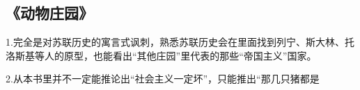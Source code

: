 \subsection{《动物庄园》}
1.完全是对苏联历史的寓言式讽刺，熟悉苏联历史会在里面找到列宁、斯大林、托洛斯基等人的原型，也能看出“其他庄园”里代表的那些“帝国主义”国家。

2.从本书里并不一定能推论出“社会主义一定坏”，只能推出“那几只猪都是